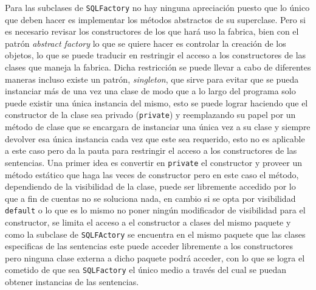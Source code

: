 Para las subclases de \verb=SQLFactory= no hay ninguna apreciación puesto que lo único que deben hacer es implementar los métodos abstractos de su superclase. Pero si es necesario revisar los constructores de los que hará uso la fabrica, bien con el patrón \textit{abstract factory} lo que se quiere hacer es controlar la creación de los objetos, lo que se puede traducir en restringir el acceso a los constructores de las clases que maneja la fabrica. Dicha restricción se puede llevar a cabo de diferentes maneras incluso existe un patrón, \textit{singleton}, que sirve para evitar que se pueda instanciar más de una vez una clase de modo que a lo largo del programa solo puede existir una única instancia del mismo\cite{Metsker:2002:DPJ}, esto se puede lograr haciendo que el constructor de la clase sea privado (\verb=private=) y reemplazando su papel por un método de clase que se encargara de instanciar una única vez a su clase y siempre devolver esa única instancia cada vez que este sea requerido, esto no es aplicable a este caso pero da la pauta para restringir el acceso a los constructores de las sentencias. Una primer idea es convertir en \verb=private= el constructor y proveer un método estático que haga las veces de constructor  pero en este caso el método, dependiendo de la visibilidad de la clase, puede ser libremente accedido por lo que a fin de cuentas no se soluciona nada, en cambio si se opta por visibilidad \verb=default= o lo que es lo mismo no poner ningún modificador de visibilidad para el constructor, se limita el acceso a el constructor a clases del mismo paquete y como la subclase de \verb=SQLFActory= se encuentra en el mismo paquete que las clases especificas de las sentencias este puede acceder libremente a los constructores pero ninguna clase externa a dicho paquete podrá acceder, con lo que se logra el cometido de que sea \verb=SQLFactory= el único medio a través del cual se puedan obtener instancias de las sentencias.   
%
%
